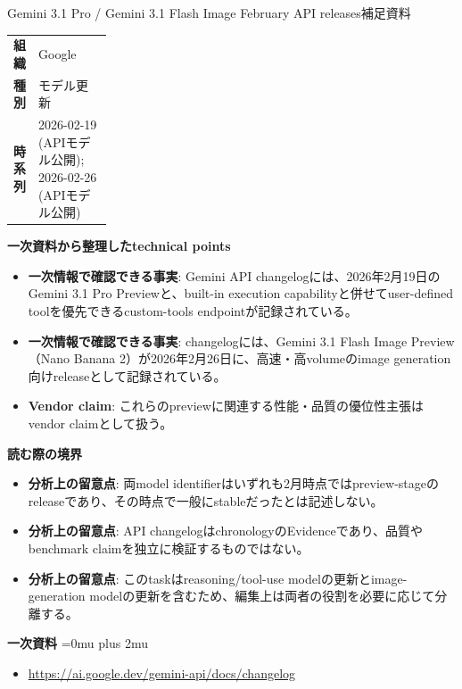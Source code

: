 \begin{technicalnote}{Gemini 3.1 Pro / Gemini 3.1 Flash Image February API releases}{補足資料}
\begingroup
\begin{tabularx}{\linewidth}{@{}>{\bfseries}p{0.22\linewidth}X@{}}
組織 & Google \\
種別 & モデル更新 \\
時系列 & 2026-02-19 (APIモデル公開); 2026-02-26 (APIモデル公開) \\
\end{tabularx}
\smallskip
{\bfseries 一次資料から整理したtechnical points}
\begin{itemize}[leftmargin=1.5em,itemsep=0.35em]
\item \textbf{一次情報で確認できる事実}: Gemini API changelogには、2026年2月19日のGemini 3.1 Pro Previewと、built-in execution capabilityと併せてuser-defined toolを優先できるcustom-tools endpointが記録されている。
\item \textbf{一次情報で確認できる事実}: changelogには、Gemini 3.1 Flash Image Preview（Nano Banana 2）が2026年2月26日に、高速・高volumeのimage generation向けreleaseとして記録されている。
\item \textbf{Vendor claim}: これらのpreviewに関連する性能・品質の優位性主張はvendor claimとして扱う。
\end{itemize}
\begin{minipage}{\linewidth}
{\bfseries 読む際の境界}
\begin{itemize}[leftmargin=1.5em,itemsep=0.35em]
\item \textbf{分析上の留意点}: 両model identifierはいずれも2月時点ではpreview-stageのreleaseであり、その時点で一般にstableだったとは記述しない。
\item \textbf{分析上の留意点}: API changelogはchronologyのEvidenceであり、品質やbenchmark claimを独立に検証するものではない。
\item \textbf{分析上の留意点}: このtaskはreasoning/tool-use modelの更新とimage-generation modelの更新を含むため、編集上は両者の役割を必要に応じて分離する。
\end{itemize}
\begin{samepage}
{\bfseries 一次資料}
\begingroup\sloppy
\Urlmuskip=0mu plus 2mu\relax
\begin{itemize}[leftmargin=1.5em,itemsep=0.25em]
\item {\scriptsize\url{https://ai.google.dev/gemini-api/docs/changelog}}
\end{itemize}
\endgroup
\end{samepage}
\end{minipage}
\endgroup
\end{technicalnote}
\medskip
